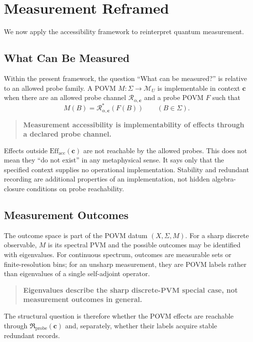 \documentclass[12pt,a4paper]{article}
\begin{document}
\section{Measurement Reframed}
\label{sec:measurement}

We now apply the accessibility framework to reinterpret quantum measurement.

\subsection{What Can Be Measured}

Within the present framework, the question ``What can be measured?'' is relative to an allowed probe family.  A POVM $M:\Sigma\to\mathcal M_U$ is implementable in context $\mathbf c$ when there are an allowed probe channel $\mathcal R_{\alpha,\mathbf c}$ and a probe POVM $F$ such that
\[
M(B)=\mathcal R_{\alpha,\mathbf c}^{*}(F(B))
\qquad(B\in\Sigma).
\]

\begin{quote}
\textbf{Measurement accessibility is implementability of effects through a declared probe channel.}
\end{quote}

Effects outside $\mathrm{Eff}_{\mathrm{acc}}(\mathbf c)$ are not reachable by the allowed probes.  This does not mean they ``do not exist'' in any metaphysical sense.  It says only that the specified context supplies no operational implementation.  Stability and redundant recording are additional properties of an implementation, not hidden algebra-closure conditions on probe reachability.

\subsection{Measurement Outcomes}

The outcome space is part of the POVM datum $(X,\Sigma,M)$.  For a sharp discrete observable, $M$ is its spectral PVM and the possible outcomes may be identified with eigenvalues.  For continuous spectrum, outcomes are measurable sets or finite-resolution bins; for an unsharp measurement, they are POVM labels rather than eigenvalues of a single self-adjoint operator.

\begin{quote}
\textbf{Eigenvalues describe the sharp discrete-PVM special case, not measurement outcomes in general.}
\end{quote}

The structural question is therefore whether the POVM effects are reachable through $\mathfrak R_{\mathrm{probe}}(\mathbf c)$ and, separately, whether their labels acquire stable redundant records.
\end{document}
